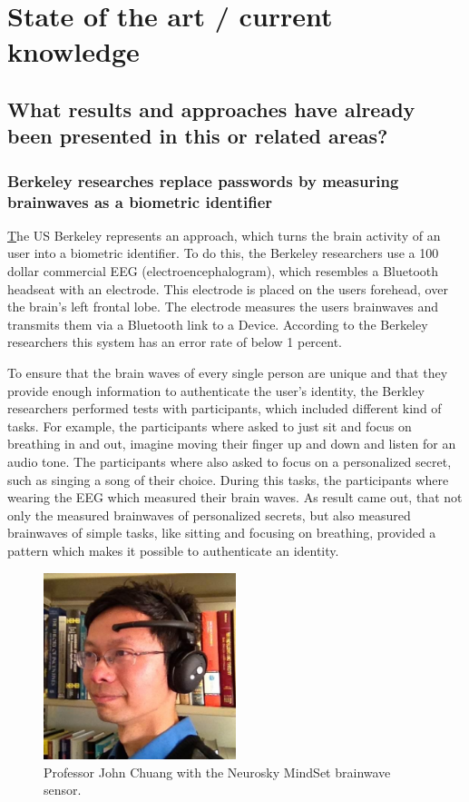 \section{State of the art / current knowledge}
\label{sect:star}
\subsection{What results and approaches have already been presented in this or related areas?}
\subsubsection{Berkeley researches replace passwords by measuring brainwaves as a biometric identifier}
\href{http://people.ischool.berkeley.edu/~chuang/pubs/usec13.pdf}
The US Berkeley represents an approach, which turns the brain activity of an user into a biometric identifier. To do this, the Berkeley researchers use a 100 dollar commercial EEG (electroencephalogram), which resembles a Bluetooth headseat with an electrode. This electrode is placed on the users forehead, over the brain's left frontal lobe. The electrode measures the users brainwaves and transmits them via a Bluetooth link to a Device. According to the Berkeley researchers this system has an error rate of below 1 percent.

To ensure that the brain waves of every single person are unique and that they provide enough information to authenticate the user's identity, the Berkley researchers performed tests with participants, which included different kind of tasks. For example, the participants where asked to just sit and focus on breathing in and out, imagine moving their finger up and down and listen for an audio tone. The participants where also asked to focus on a personalized secret, such as singing a song of their choice. During this tasks, the participants where wearing the EEG which measured their brain waves. As result came out, that not only the measured brainwaves of personalized secrets, but also measured brainwaves of simple tasks, like sitting and focusing on breathing, provided a pattern which makes it possible to authenticate an identity.
\begin{figure}[H]
	\centering
    \includegraphics[width=0.5\textwidth]{john_chuang}
    \caption{Professor John Chuang with the Neurosky MindSet brainwave sensor.}
\end{figure}
